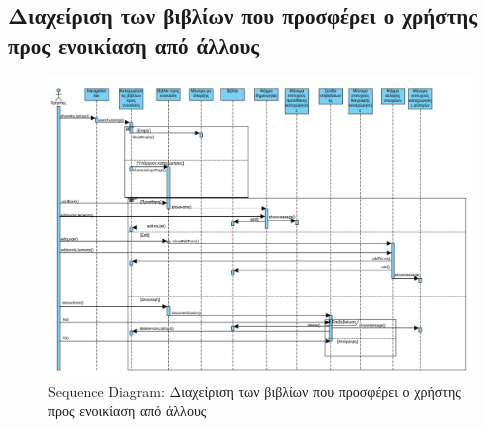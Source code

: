 \documentclass[12pt,a4paper]{article}
\begin{document}
\subsection{Διαχείριση των βιβλίων που προσφέρει ο χρήστης προς ενοικίαση από άλλους}
\begin{figure}[H]
	\includegraphics[width=\textwidth]{Manage User Book Listings Sequence.png}
	\caption{Sequence Diagram: Διαχείριση των βιβλίων που προσφέρει ο χρήστης προς ενοικίαση από άλλους}
	\label{Sequence Diagram: Διαχείριση των βιβλίων που προσφέρει ο χρήστης προς ενοικίαση από άλλους}
\end{figure}
\end{document}

